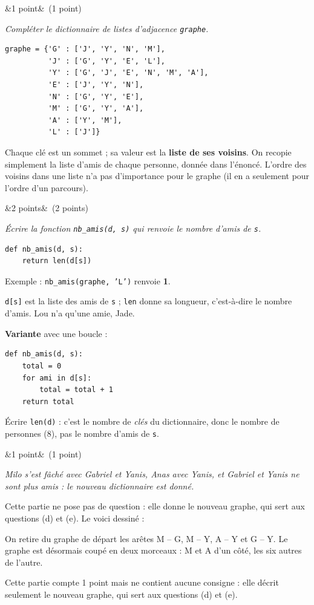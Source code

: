 \documentclass[11pt, a4paper]{exam}
\newcommand{\code}[1]{\texttt{#1}}
\newcommand{\Q}[3]{\par\needspace{5\baselineskip}\bigskip\noindent{\large\bfseries Question #1}\ifx&#2&\else\ \textnormal{(#2)}\fi\par\nopagebreak\smallskip\noindent\textit{#3}\par\nopagebreak\smallskip}
\newcommand{\sommetsAmis}{%
\node (G) at (0,0) {G}; \node (M) at (0,2.2) {M}; \node (N) at (2.6,2.2) {N};
\node (E) at (5.2,2.2) {E}; \node (A) at (5.2,4.4) {A}; \node (Y) at (7.8,4.4) {Y};
\node (J) at (7.8,2.2) {J}; \node (L) at (7.8,0) {L};}
\begin{document}
\Q{3 (a)}{1 point}{Compléter le dictionnaire de listes d'adjacence \code{graphe}.}
\begin{reponse}
\begin{lstlisting}
graphe = {'G' : ['J', 'Y', 'N', 'M'],
          'J' : ['G', 'Y', 'E', 'L'],
          'Y' : ['G', 'J', 'E', 'N', 'M', 'A'],
          'E' : ['J', 'Y', 'N'],
          'N' : ['G', 'Y', 'E'],
          'M' : ['G', 'Y', 'A'],
          'A' : ['Y', 'M'],
          'L' : ['J']}
\end{lstlisting}
\end{reponse}
Chaque clé est un sommet ; sa valeur est la \textbf{liste de ses voisins}. On recopie simplement la liste d'amis de chaque personne, donnée dans l'énoncé. L'ordre des voisins dans une liste n'a pas d'importance pour le graphe (il en a seulement pour l'ordre d'un parcours).

\Q{3 (b)}{2 points}{Écrire la fonction \code{nb\_amis(d, s)} qui renvoie le nombre d'amis de \code{s}.}
\begin{reponse}
\begin{lstlisting}
def nb_amis(d, s):
    return len(d[s])
\end{lstlisting}
Exemple : \code{nb\_amis(graphe, 'L')} renvoie \textbf{1}.
\end{reponse}
\code{d[s]} est la liste des amis de \code{s} ; \code{len} donne sa longueur, c'est-à-dire le nombre d'amis. Lou n'a qu'une amie, Jade.

\textbf{Variante} avec une boucle :
\begin{lstlisting}
def nb_amis(d, s):
    total = 0
    for ami in d[s]:
        total = total + 1
    return total
\end{lstlisting}
\begin{erreur}
Écrire \code{len(d)} : c'est le nombre de \emph{clés} du dictionnaire, donc le nombre de personnes (8), pas le nombre d'amis de \code{s}.
\end{erreur}

\Q{3 (c)}{1 point}{Milo s'est fâché avec Gabriel et Yanis, Anas avec Yanis, et Gabriel et Yanis ne sont plus amis : le nouveau dictionnaire est donné.}
\begin{reponse}
Cette partie ne pose pas de question : elle donne le nouveau graphe, qui sert aux questions (d) et (e). Le voici dessiné :
\begin{center}
\end{center}
\end{reponse}
On retire du graphe de départ les arêtes M -- G, M -- Y, A -- Y et G -- Y. Le graphe est désormais coupé en deux morceaux : M et A d'un côté, les six autres de l'autre.
\begin{remarque}
Cette partie compte 1 point mais ne contient aucune consigne : elle décrit seulement le nouveau graphe, qui sert aux questions (d) et (e).
\end{remarque}
\end{document}
